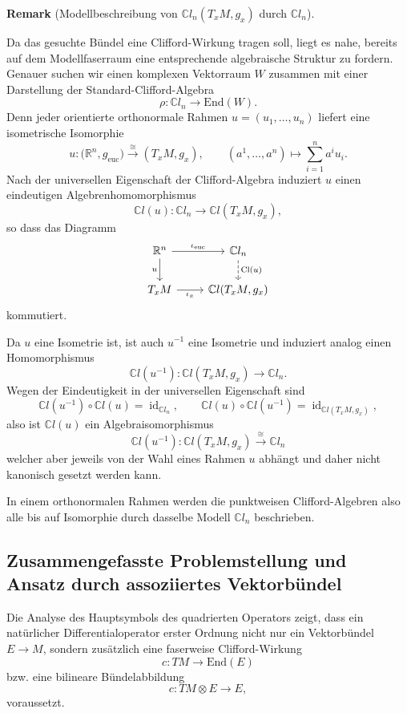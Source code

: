 \documentclass[10pt, letterpaper]{article}
\newcommand{\id}{\operatorname{id}}
\newcommand{\R}{\mathbb{R}}
\newcommand{\C}{\mathbb{C}}
\newcommand{\End}{\mathrm{End}}
\newcommand{\Cl}{\mathrm{Cl}}
\newcommand{\CustomHeading}[3]{%
  \par\medskip\noindent%
  \textbf{#1 #2} \textnormal{(#3)}.\enskip%
}
\newenvironment{REM}[2]{\CustomHeading{Remark}{#1}{#2}}{}
\begin{document}
\begin{REM}{}{Modellbeschreibung von $\C l_n(T_xM,g_x)$ durch $\C l_n$}
Da das gesuchte Bündel eine Clifford-Wirkung tragen soll, liegt es nahe, bereits auf dem Modellfaserraum eine entsprechende algebraische Struktur zu fordern. Genauer suchen wir einen komplexen Vektorraum \(W\) zusammen mit einer Darstellung der Standard-Clifford-Algebra
\[
\rho: \C l_n \to \End(W).
\]
Denn jeder orientierte orthonormale Rahmen $u=(u_1,\dots,u_n)$ liefert eine isometrische Isomorphie
\[
u:\bigl(\R^n,g_{\mathrm{euc}}\bigr)\xrightarrow{\;\cong\;}(T_xM,g_x),
\qquad
(a^1,\dots,a^n)\longmapsto \sum_{i=1}^n a^i u_i.
\]
Nach der universellen Eigenschaft der Clifford-Algebra induziert \(u\) einen
eindeutigen Algebrenhomomorphismus
\[
\C l(u):\C l_n\longrightarrow \C l(T_xM,g_x),
\]
so dass das Diagramm
\[
\begin{tikzcd}
\R^n \arrow[r, "\iota_{\mathrm{euc}}"] \arrow[d, "u"'] 
& \C l_n \arrow[d, dashed, "\Cl(u)"] \\
T_xM \arrow[r, "\iota_x"'] 
& \C l(T_xM,g_x)
\end{tikzcd}
\]
kommutiert.

Da \(u\) eine Isometrie ist, ist auch \(u^{-1}\) eine Isometrie und induziert
analog einen Homomorphismus
\[
\C l(u^{-1}):\C l(T_xM,g_x)\to \C l_n.
\]
Wegen der Eindeutigkeit in der universellen Eigenschaft sind
\[
\C l(u^{-1})\circ \C l(u)=\id_{\C l_n},
\qquad
\C l(u)\circ \C l(u^{-1})=\id_{\C l(T_xM,g_x)},
\]
also ist \(\C l(u)\) ein Algebraisomorphismus
$$\C l(u^{-1}): \C l(T_xM,g_x)\overset{\cong}{\to} \C l_n$$
welcher aber jeweils von der Wahl eines Rahmen $u$ abhängt und daher nicht kanonisch gesetzt werden kann.

In einem orthonormalen Rahmen werden die punktweisen Clifford-Algebren also
alle bis auf Isomorphie durch dasselbe Modell \(\C l_n\) beschrieben. 

\end{REM}
\bigskip






\subsection{Zusammengefasste Problemstellung und Ansatz durch assoziiertes Vektorbündel}


Die Analyse des Hauptsymbols des quadrierten Operators zeigt, dass ein natürlicher Differentialoperator erster Ordnung nicht nur ein Vektorbündel \(E\to M\), sondern zusätzlich eine faserweise Clifford-Wirkung
\[
c:TM\longrightarrow \End(E)
\]
bzw. eine bilineare Bündelabbildung
\[
c:TM\otimes E\longrightarrow E,
\] 
voraussetzt. 
\end{document}
